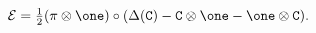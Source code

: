 \begin{equation}
{\mathcal E} = \textstyle{\frac 12} (\pi \otimes \one) \circ ( 
\Delta(\texttt{C}) - \texttt{C} \otimes \one - \one \otimes 
\texttt{C} ).
\label{eq:CurlyEDefn}
\end{equation}

